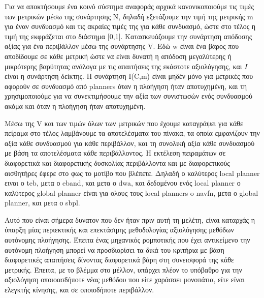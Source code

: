 \documentclass[a4paper,10pt]{article}
\begin{document}
Για να αποκτήσουμε ένα κοινό σύστημα αναφοράς αρχικά κανονικοποιούμε τις τιμές
των μετρικών μέσω της συνάρτησης N, δηλαδή εξετάζουμε την τιμή της μετρικής m
για έναν συνδυασμό και τις ακραίες τιμές της για κάθε συνδυασμό, ώστε στο τέλος
η τιμή της εκφράζεται στο διάστημα [0,1].  Κατασκευάζουμε την συνάρτηση
απόδοσης αξίας για ένα περιβάλλον μέσω της συνάρτησης V. Εδώ w είναι ένα βάρος
που αποδίδουμε σε κάθε μετρική ώστε να είναι δυνατή η απόδοση μεγαλύτερης ή
μικρότερης βαρύτητας ανάλογα με τις απαιτήσεις της εκάστοτε αξιολόγησης, και
$I$ είναι η συνάρτηση δείκτης. Η συνάρτηση I(C,m) είναι μηδέν μόνο για μετρικές
που αφορούν σε συνδυασμό από planners όταν η πλοήγηση ήταν αποτυχημένη, και τη
χρησιμοποιούμε για να συνεκτιμήσουμε την αξία των συνιστωσών ενός συνδυασμού
ακόμα και όταν η πλοήγηση ήταν αποτυχημένη.

Μέσω της V και των τιμών όλων των μετρικών που έχουμε καταγράψει για κάθε
πείραμα στο τέλος λαμβάνουμε τα αποτελέσματα του πίνακα, τα οποία εμφανίζουν
την αξία κάθε συνδυασμού για κάθε περιβάλλον, και τη συνολική αξία κάθε
συνδυασμού με βάση τα αποτελέσματα κάθε περιβάλλοντος. Η εκτέλεση πειραμάτων σε
διαφορετικά και διαφορετικής δυσκολίας περιβάλλοντα και με διαφορετικούς
αισθητήρες έφερε στο φως το μοτίβο που βλέπετε. Δηλαδή ο καλύτερος local planner
ειναι ο teb, μετα ο eband, και μετα ο dwa, και δεδομένου ενός local planner
ο καλύτερος global planner είναι για ολους τους local planners o navfn, μετα ο
global planner, και μετα ο sbpl.

Αυτό που είναι σήμερα δυνατον που δεν ήταν πριν αυτή τη μελέτη, είναι
καταρχάς η ύπαρξη μίας περιεκτικής και επεκτάσιμης μεθοδολογίας αξιολόγησης
μεθόδων αυτόνομης πλοήγησης. Έπειτα ένας μηχανικός ρομποτικής που έχει
αντικείμενο την αυτόνομη πλοήγηση μπορεί να προσδιορίσει τα δικά του κριτήρια
με βάση διαφορετικές απαιτήσεις δίνοντας διαφορετικά βάρη στη συνεισφορά της
κάθε μετρικής. Έπειτα, με το βλέμμα στο μέλλον, υπάρχει πλέον το υπόβαθρο για
την αξιολόγηση οποιοασδήποτε νέας μεθόδου που είτε χαράσσει μονοπάτια, είτε
είναι ελεγκτής κίνησης, και σε οποιοδήποτε περιβάλλον.
\end{document}
